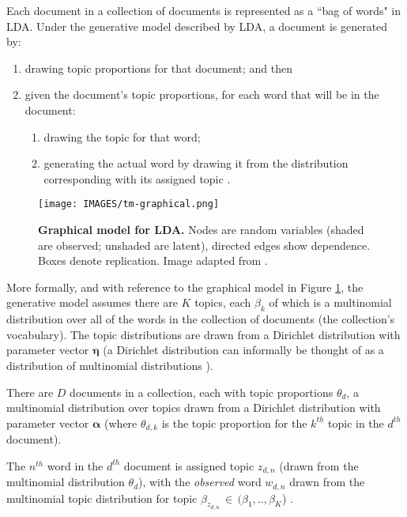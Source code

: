 Each document in a collection of documents is represented as a ``bag of words" in LDA. Under the generative model described by LDA, a document is generated by:
\begin{enumerate}
\item drawing topic proportions for that document; and then
\item given the document's topic proportions, for each word that will be in the document:
\begin{enumerate}
\item drawing the topic for that word;
\item generating the actual word by drawing it from the distribution corresponding with its assigned topic \cite{blei2011introduction}.
\end{enumerate}
\end{enumerate}

\begin{figure}
\centering
\texttt{[image: IMAGES/tm-graphical.png]}
\caption[Graphical model for LDA]{\textbf{Graphical model for LDA.} Nodes are random variables (shaded are observed; unshaded are latent), directed edges show dependence. Boxes denote replication. Image adapted from \protect\cite{blei2009topic}.}
\label{fig:tm-graphical}
\end{figure}

More formally, and with reference to the graphical model in Figure \ref{fig:tm-graphical}, the generative model assumes there are $K$ topics, each $\beta_k$ of which is a multinomial distribution over all of the words in the collection of documents (the collection's vocabulary). The topic distributions are drawn from a Dirichlet distribution with parameter vector $\boldsymbol{\eta}$ (a Dirichlet distribution can informally be thought of as a distribution of multinomial distributions \cite{frigyik2010introduction}).

There are $D$ documents in a collection, each with topic proportions $\theta_d$, a multinomial distribution over topics drawn from a Dirichlet distribution with parameter vector $\boldsymbol{\alpha}$ (where $\theta_{d,k}$ is the topic proportion for the $k^{th}$ topic in the $d^{th}$ document).

The $n^{th}$ word in the $d^{th}$ document is assigned topic $z_{d,n}$ (drawn from the multinomial distribution $\theta_d$), with the {\em observed} word $w_{d,n}$ drawn from the multinomial topic distribution for topic $\beta_{z_{d,n}} \, \in \, (\beta_1, .. ,\beta_K$) \cite{blei2003latent}.

